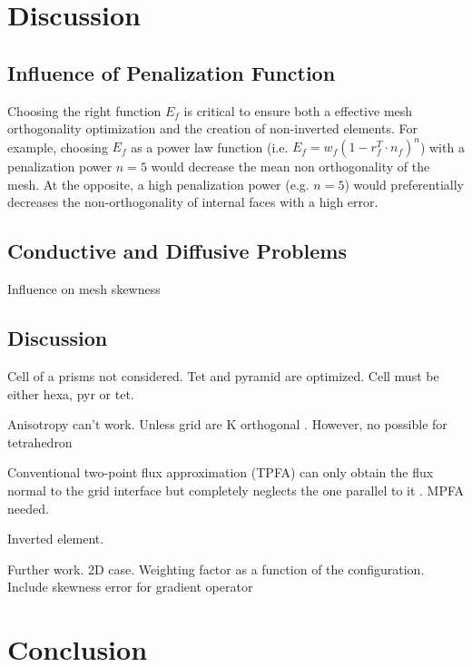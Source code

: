 \documentclass[11pt]{article}
\begin{document}
\section{Discussion}

\subsection{Influence of Penalization Function}

Choosing the right function $E_f$ is critical to ensure both a effective mesh orthogonality optimization and the creation of non-inverted elements. 
For example, choosing $E_f$ as a power law function (i.e. $E_f=w_f (1-r_f^T\cdot n_f)^n$) with a penalization power $n=5$ would decrease the mean non orthogonality of the mesh.
At the opposite, a high penalization power (e.g. $n=5$) would preferentially decreases the non-orthogonality of internal faces with a high error.


\subsection{Conductive and Diffusive Problems}

Influence on mesh skewness

\subsection{Discussion}

Cell of a prisms not considered. Tet and pyramid are optimized. Cell must be either hexa, pyr or tet.

Anisotropy can't work.
Unless grid are K orthogonal \cite{heinemann_modelling_1991}.
However, no possible for tetrahedron

Conventional two-point flux approximation (TPFA) can only obtain the flux normal to the grid interface but completely neglects the one parallel to it \cite{}. MPFA needed. %

Inverted element.

Further work.
2D case.
Weighting factor as a function of the configuration.
Include skewness error for gradient operator


\section{Conclusion}
\end{document}
